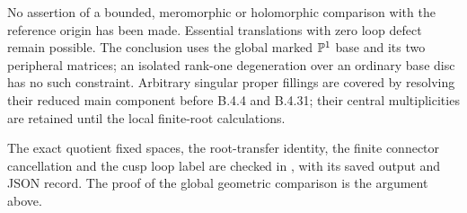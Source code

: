 \begin{remark}
No assertion of a bounded, meromorphic or holomorphic
comparison with the reference origin has been made.
Essential translations with zero loop defect remain
possible. The conclusion uses the global marked
$\mathbb P^1$ base and its two peripheral matrices; an isolated
rank-one degeneration over an ordinary base disc has
no such constraint. Arbitrary singular proper fillings
are covered by resolving their reduced main component
before B.4.4 and B.4.31; their central multiplicities
are retained until the local finite-root calculations.
\end{remark}

The exact quotient fixed spaces, the root-transfer identity,
the finite connector cancellation and the cusp loop label
are checked in
, with its saved
output and JSON record. The proof of the global geometric
comparison is the argument above.
